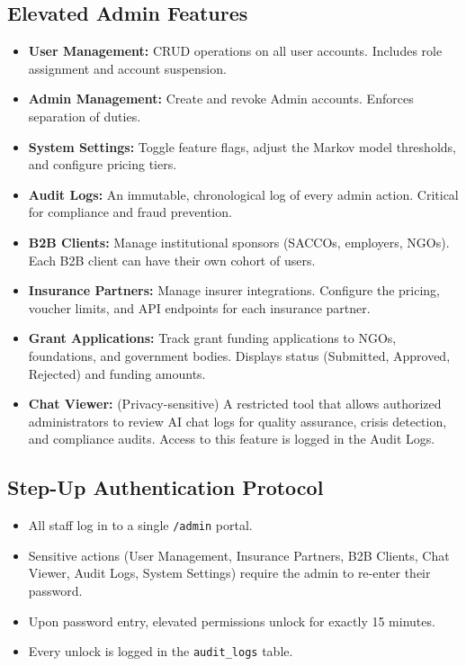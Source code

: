 \documentclass[11pt,a4paper]{article}
\begin{document}
\subsection{Elevated Admin Features}
\begin{itemize}
    \item \textbf{User Management:} CRUD operations on all user accounts. Includes role assignment and account suspension.
    \item \textbf{Admin Management:} Create and revoke Admin accounts. Enforces separation of duties.
    \item \textbf{System Settings:} Toggle feature flags, adjust the Markov model thresholds, and configure pricing tiers.
    \item \textbf{Audit Logs:} An immutable, chronological log of every admin action. Critical for compliance and fraud prevention.
    \item \textbf{B2B Clients:} Manage institutional sponsors (SACCOs, employers, NGOs). Each B2B client can have their own cohort of users.
    \item \textbf{Insurance Partners:} Manage insurer integrations. Configure the pricing, voucher limits, and API endpoints for each insurance partner.
    \item \textbf{Grant Applications:} Track grant funding applications to NGOs, foundations, and government bodies. Displays status (Submitted, Approved, Rejected) and funding amounts.
    \item \textbf{Chat Viewer:} (Privacy-sensitive) A restricted tool that allows authorized administrators to review AI chat logs for quality assurance, crisis detection, and compliance audits. Access to this feature is logged in the Audit Logs.
\end{itemize}

\subsection{Step-Up Authentication Protocol}
\begin{itemize}
    \item All staff log in to a single \texttt{/admin} portal.
    \item Sensitive actions (User Management, Insurance Partners, B2B Clients, Chat Viewer, Audit Logs, System Settings) require the admin to re-enter their password.
    \item Upon password entry, elevated permissions unlock for exactly 15 minutes.
    \item Every unlock is logged in the \texttt{audit\_logs} table.
\end{itemize}
\end{document}
